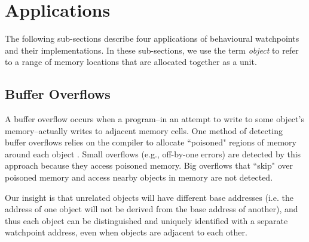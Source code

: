 \documentclass[letterpaper,twocolumn,10pt]{article}
\begin{document}

\section{Applications\label{sec:applications}}
The following sub-sections describe four applications of behavioural watchpoints and their implementations. In these sub-sections, we use the term \emph{object} to refer to a range of memory locations that are allocated together as a unit.


\subsection{Buffer Overflows \label{sec:buffer_overflows}}
A buffer overflow occurs when a program--in an attempt to write to some object's memory--actually writes to adjacent memory cells. One method of detecting buffer overflows relies on the compiler to allocate ``poisoned" regions of memory around each object \cite{AddressSanitizer}. Small overflows (e.g., off-by-one errors) are detected by this approach because they access poisoned memory. Big overflows that ``skip" over poisoned memory and access nearby objects in memory are not detected.

Our insight is that unrelated objects will have different base addresses (i.e. the address of one object will not be derived from the base %
address of another), and thus each object can be distinguished and uniquely identified with a separate watchpoint address, even when objects are adjacent to each other.
\end{document}
